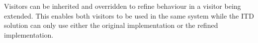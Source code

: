 Visitors can be inherited and overridden to refine behaviour in a visitor
being extended. This enables both visitors to be used in the same system
while the ITD solution can only use either the original implementation 
or the refined implementation. 

